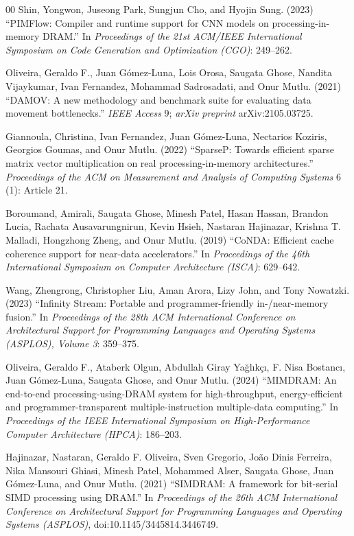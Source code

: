 \documentclass{ieeeaccess}
\begin{document}
\begin{thebibliography}{00}
 Shin, Yongwon, Juseong Park, Sungjun Cho, and Hyojin Sung. (2023) ``PIMFlow: Compiler and runtime support for CNN models on processing-in-memory DRAM.'' In \emph{Proceedings of the 21st ACM/IEEE International Symposium on Code Generation and Optimization (CGO)}: 249--262.

 Oliveira, Geraldo F., Juan G\'omez-Luna, Lois Orosa, Saugata Ghose, Nandita Vijaykumar, Ivan Fernandez, Mohammad Sadrosadati, and Onur Mutlu. (2021) ``DAMOV: A new methodology and benchmark suite for evaluating data movement bottlenecks.'' \emph{IEEE Access} 9; \emph{arXiv preprint} arXiv:2105.03725.

 Giannoula, Christina, Ivan Fernandez, Juan G\'omez-Luna, Nectarios Koziris, Georgios Goumas, and Onur Mutlu. (2022) ``SparseP: Towards efficient sparse matrix vector multiplication on real processing-in-memory architectures.'' \emph{Proceedings of the ACM on Measurement and Analysis of Computing Systems} 6 (1): Article 21.

 Boroumand, Amirali, Saugata Ghose, Minesh Patel, Hasan Hassan, Brandon Lucia, Rachata Ausavarungnirun, Kevin Hsieh, Nastaran Hajinazar, Krishna T. Malladi, Hongzhong Zheng, and Onur Mutlu. (2019) ``CoNDA: Efficient cache coherence support for near-data accelerators.'' In \emph{Proceedings of the 46th International Symposium on Computer Architecture (ISCA)}: 629--642.

 Wang, Zhengrong, Christopher Liu, Aman Arora, Lizy John, and Tony Nowatzki. (2023) ``Infinity Stream: Portable and programmer-friendly in-/near-memory fusion.'' In \emph{Proceedings of the 28th ACM International Conference on Architectural Support for Programming Languages and Operating Systems (ASPLOS), Volume 3}: 359--375.

 Oliveira, Geraldo F., Ataberk Olgun, Abdullah Giray Ya\u{g}l{\i}k\c{c}{\i}, F. Nisa Bostanc{\i}, Juan G\'omez-Luna, Saugata Ghose, and Onur Mutlu. (2024) ``MIMDRAM: An end-to-end processing-using-DRAM system for high-throughput, energy-efficient and programmer-transparent multiple-instruction multiple-data computing.'' In \emph{Proceedings of the IEEE International Symposium on High-Performance Computer Architecture (HPCA)}: 186--203.

 Hajinazar, Nastaran, Geraldo F. Oliveira, Sven Gregorio, Jo\~ao Dinis Ferreira, Nika Mansouri Ghiasi, Minesh Patel, Mohammed Alser, Saugata Ghose, Juan G\'omez-Luna, and Onur Mutlu. (2021) ``SIMDRAM: A framework for bit-serial SIMD processing using DRAM.'' In \emph{Proceedings of the 26th ACM International Conference on Architectural Support for Programming Languages and Operating Systems (ASPLOS)}, doi:10.1145/3445814.3446749.


\end{thebibliography}
\end{document}
